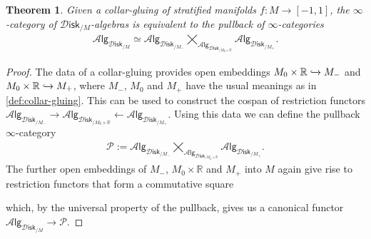 \documentclass[12pt,a4paper]{article}
\newcounter{counter} \numberwithin{counter}{section}
\theoremstyle{definition}
\theoremstyle{plain}
\newtheorem{theorem}[counter]{Theorem}
\theoremstyle{remark}
\newcommand{\disk}{\mathscr{D} \mathsf{isk}}
\newcommand{\alg}[1]{\mathscr{A} \mathsf{lg}_{#1}}
\begin{document}
\begin{theorem}\label{thm:gluing_alg_disk/M}
    Given a collar-gluing of stratified manifolds $f: M \rightarrow [-1,1]$, the $\infty$-category of $\disk_{/M}$-algebras is equivalent to the pullback of $\infty$-categories
    \begin{align}
        \alg{\disk_{/M}} \simeq \alg{\disk_{/M_-}} \bigtimes_{\alg{\disk_{/M_0 \times \mathbb{R}}}} \alg{\disk_{/M_+}}.
    \end{align}
\end{theorem}

\begin{proof}
    The data of a collar-gluing provides open embeddings $M_0 \times \mathbb{R} \xhookrightarrow{} M_-$ and $M_0 \times \mathbb{R} \xhookrightarrow{} M_+$, where $M_-$, $M_0$ and $M_+$ have the usual meanings as in \cref{def:collar-gluing}. This can be used to construct the cospan of restriction functors $\alg{\disk_{/M_-}} \rightarrow \alg{\disk_{/M_0 \times \mathbb{R}}} \leftarrow \alg{\disk_{/M_+}}$. Using this data we can define the pullback $\infty$-category
    \begin{align}
        \mathscr{P} := \alg{\disk_{/M_-}} \bigtimes_{\alg{\disk_{/M_0 \times \mathbb{R}}}} \alg{\disk_{/M_+}}.
    \end{align}
    The further open embeddings of $M_-$, $M_0 \times \mathbb{R}$ and $M_+$ into $M$ again give rise to restriction functors that form a commutative square
    \begin{center}
    \end{center}
    which, by the universal property of the pullback, gives us a canonical functor $\alg{\disk_{/M}} \rightarrow \mathscr{P}$.
    

\end{proof}
\end{document}
